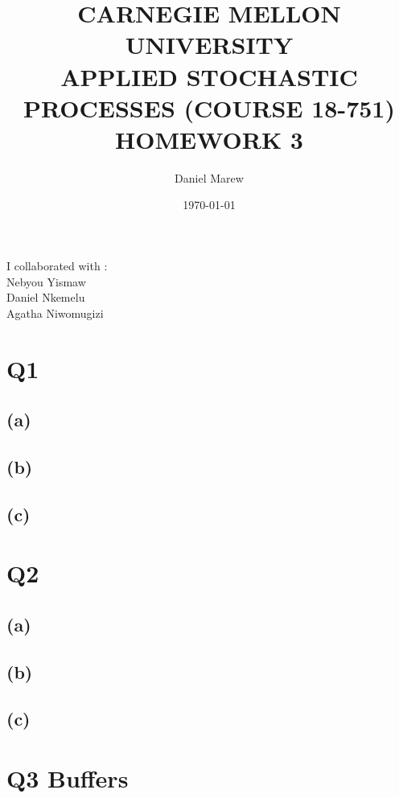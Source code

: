 \documentclass[a4paper,11pt]{article}
\begin{document}
\title{\color{red}CARNEGIE MELLON UNIVERSITY\\
APPLIED STOCHASTIC PROCESSES  (COURSE 18-751)\\
HOMEWORK 3}
\author{Daniel Marew}
\date{\today}
\clearpage\maketitle

\thispagestyle{empty}
\newpage
I collaborated with :\\
\hspace*{6cm}
Nebyou Yismaw\\
\hspace*{6cm}
Daniel    Nkemelu\\
\hspace*{6cm}
Agatha Niwomugizi
\thispagestyle{empty}
\newpage
\clearpage
\setcounter{page}{1}

\section*{Q1}
\subsection*{(a)}
\subsection*{(b)}
\subsection*{(c)}

\newpage
\section*{Q2}
\subsection*{(a)}
\subsection*{(b)}
\subsection*{(c)}
\newpage

\section*{Q3 \quad Buffers}
\end{document}
